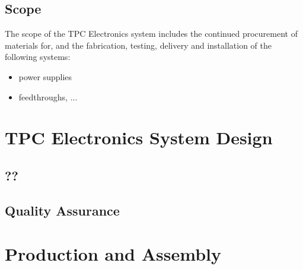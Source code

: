 

\subsection{Scope}
\label{sec:fdsp-tpc-elec-scope}

The scope of the TPC Electronics system includes the continued procurement of materials for, and the fabrication, testing, delivery and installation of the following systems: 


\begin{itemize}
\item power supplies 
\item feedthroughs, ...
\end{itemize}



\section{TPC Electronics System Design}
\label{sec:fdsp-tpc-elec-design}




\subsection{??}
\label{sec:fdsp-tpc-elec-??}

\subsection{Quality Assurance}
\label{sec:fdsp-tpc-elec-qa}




\section{Production and Assembly}
\label{sec:fdsp-tpc-elec-prod-assy}

